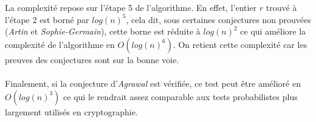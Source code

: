 		\paragraph{}La complexité repose sur l'étape 5 de l'algorithme. En effet, l'entier $r$ trouvé à l'étape 2 est borné par $log(n)^{5}$, cela dit, sous certaines conjectures non prouvées (\textit{Artin} et \textit{Sophie-Germain}), cette borne est réduite à $log(n)^2$ ce qui améliore la complexité de l'algorithme en $O(log(n)^6)$. On retient cette complexité car les preuves des conjectures sont sur la bonne voie.
		\paragraph{}Finalement, si la conjecture d'\textit{Agrawal} est vérifiée, ce test peut être amélioré en $O(log(n)^{3})$ ce qui le rendrait assez comparable aux tests probabilistes plus largement utilisés en cryptographie.
